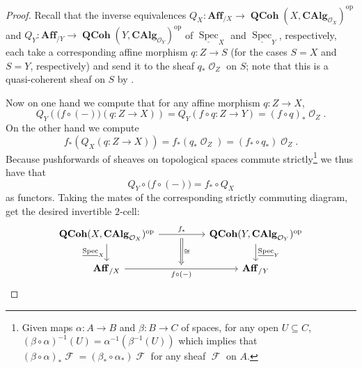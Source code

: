 \documentclass{amsart}
\theoremstyle{definition}
\DeclareMathOperator{\Fscr}{\mathscr{F}}
\DeclareMathOperator{\Ocal}{\mathcal{O}}
\DeclareMathOperator{\op}{op}
\DeclareMathOperator{\Spec}{Spec}
\newcommand{\CAlg}[1]{\mathbf{CAlg}_{#1}}
\newcommand{\RelSpec}[1]{\underline{\Spec}_{#1}}
\DeclareMathOperator{\QCoh}{\mathbf{QCoh}}
\numberwithin{equation}{subsection}
\begin{document}
\begin{proof}
Recall that the inverse equivalences $Q_X:\mathbf{Aff}_{/X} \to \QCoh(X,\CAlg{\Ocal_X})^{\op}$ and $Q_Y:\mathbf{Aff}_{/Y} \to \QCoh(Y,\CAlg{\Ocal_Y})^{\op}$ of $\RelSpec{X}$ and $\RelSpec{Y}$, respectively, each take a corresponding affine morphism $q:Z \to S$ (for the cases $S = X$ and $S = Y$, respectively) and send it to the sheaf $q_{\ast}\Ocal_Z$ on $S$; note that this is a quasi-coherent sheaf on $S$ by \cite[Proposition 1.2.6]{EGA2}. 

Now on one hand we compute that for any affine morphism $q:Z \to X$,
\[
Q_{Y}\left(\bigg(f \circ (-)\bigg)(q:Z \to X)\right) = Q_{Y}\left(f \circ q:Z \to Y\right) = (f \circ q)_{\ast}\Ocal_Z.
\]
On the other hand we compute
\[
f_{\ast}\left(Q_X(q:Z \to X)\right) = f_{\ast}\left(q_{\ast}\Ocal_Z\right) = (f_{\ast} \circ q_{\ast})\Ocal_Z.
\]
Because pushforwards of sheaves on topological spaces commute strictly\footnote{Given maps $\alpha:A \to B$ and $\beta:B \to C$ of spaces, for any open $U \subseteq C$, $(\beta \circ \alpha)^{-1}(U) = \alpha^{-1}(\beta^{-1}(U))$ which implies that $(\beta \circ \alpha)_{\ast}\Fscr = (\beta_{\ast} \circ \alpha_{\ast})\Fscr$ for any sheaf $\Fscr$ on $A$.} we thus have that
\[
Q_{Y} \circ \bigg(f \circ (-)\bigg) = f_{\ast} \circ Q_{X}
\]
as functors. Taking the mates of the corresponding strictly commuting diagram, get the desired invertible $2$-cell:
\[
\begin{tikzcd}
	\QCoh(X,\CAlg{\Ocal_X})^{\op} \ar[d, swap]{}{\RelSpec{X}} \ar[rr, ""{name = U}]{}{f_{\ast}} & & \QCoh(Y,\CAlg{\Ocal_Y})^{\op}	\ar[d]{}{\RelSpec{Y}} \\
	\mathbf{Aff}_{/X} \ar[rr, swap, ""{name = D}]{}{f \circ (-)}  & & \mathbf{Aff}_{/Y} 
	\ar[from = U, to = D, Rightarrow, shorten <= 4pt, shorten >= 4pt]{}{\cong}
\end{tikzcd}
\]
\end{proof}
\end{document}
